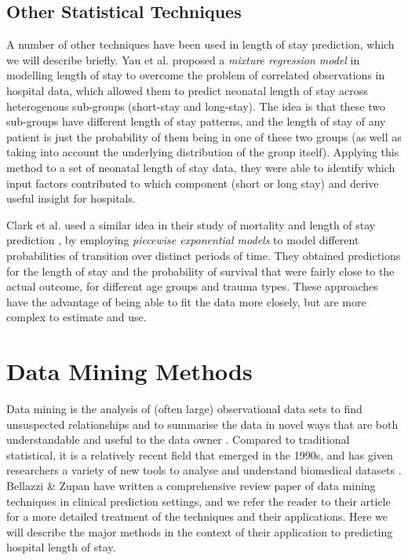 \subsection{Other Statistical Techniques}
A number of other techniques have been used in length of stay prediction, which
we will describe briefly.
Yau et al. \citep{Yau2003} proposed a \textit{mixture regression model} in
modelling
length of stay to overcome the problem of correlated observations in hospital
data, which allowed them to predict neonatal length of stay across heterogenous
sub-groups (short-stay and long-stay). The idea is that these two sub-groups
have different length of stay patterns, and the length of stay of any patient
is just the probability of them being in one of these two groups (as well as
taking into account the underlying distribution of the group itself). Applying
this method to a set of neonatal length of stay data, they were able to
identify which input factors contributed to which component (short or long
stay) and derive useful insight for hospitals.

Clark et al. used a similar idea in their study of mortality and length of stay
prediction \citep{Clark2002}, by employing \textit{piecewise exponential models}
to model different probabilities of transition over distinct periods of time.
They obtained predictions for the length of stay and the probability of
survival that were fairly close to the actual outcome, for different age groups
and trauma types. These approaches have the advantage of being able to fit the
data more closely, but are more complex to estimate and use.

\section{Data Mining Methods}
Data mining is the analysis of (often large) observational data sets to find
unsuspected relationships and to summarise the data in novel ways that are both
understandable and useful to the data owner \citep{Hand2001}. Compared to
traditional statistical, it is a relatively recent field that emerged in the
1990s, and has
given researchers a variety of new tools to analyse and understand biomedical
datasets \citep{Bellazzi2008,Yoo2012}. Bellazzi \& Zupan \citep{Bellazzi2008}
have written a
comprehensive review paper of data mining techniques in clinical prediction
settings, and we refer the reader to their article for a more detailed
treatment of the techniques and their applications. Here we will describe the
major methods in the context of their application to predicting hospital length
of stay.

